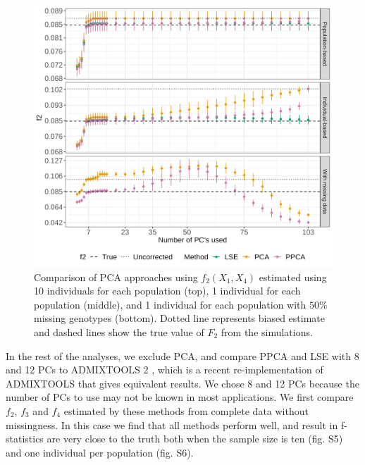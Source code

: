 \documentclass[12pt, letterpaper]{article}
\begin{document}
\begin{figure}[ht!]
    \includegraphics[width=16.5cm]{plots/simfiles_Ne1000_split_times1000/npop10_nind100/missing0.5/mu0.05_main_fig_all_pca.png}
    \centering
    \caption{Comparison of PCA approaches using $f_2(X_1,X_4)$ estimated using 10 individuals for each population (top), 1 individual for each population (middle), and 1 individual for each population with $50\%$ missing genotypes (bottom). Dotted line represents biased estimate and dashed lines show the true value of $F_2$ from the simulations.}
    \label{fig:comparison}
\end{figure}


In the rest of the analyses, we exclude PCA, and compare PPCA and LSE with 8 and 12 PCs to ADMIXTOOLS 2 \cite{maier_limits_2022}, which is a recent re-implementation of ADMIXTOOLS \cite{patterson_ancient_2012} that gives equivalent results. We chose 8 and 12 PCs because the number of PCs to use may not be known in most applications. We first compare $f_2$, $f_3$ and $f_4$ estimated by these methods from complete data without missingness. In this case we find that all  methods perform well, and result in f-statistics are very close to the truth both when the sample size is ten (fig. S5) and one individual per population (fig. S6). 
\end{document}
